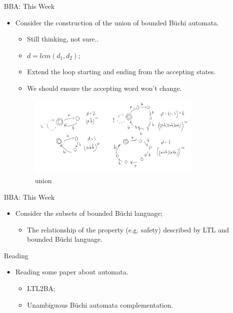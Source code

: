 \documentclass[aspectratio=1610, 13pt]{beamer}
\newcommand{\buchi}{B\"uchi }
\begin{document}
\begin{frame}{BBA: This Week}
    \begin{itemize}
        \item Consider the construction of the union of bounded \buchi automata.
        \begin{itemize}
            \item Still thinking, not sure..
            \item $d = lcm(d_1, d_2)$;
            \item Extend the loop starting and ending from the accepting states.
            \item We should ensure the accepting word won't change. 
        \end{itemize}
         \begin{figure}[b]
            \centering  
            \includegraphics[width=0.8\textwidth]{1.jpeg}
            \caption{union}
            \end{figure}
    \end{itemize}
\end{frame}

\begin{frame}{BBA: This Week}
\begin{itemize}
    \item Consider the subsets of bounded \buchi language;
    \begin{itemize}
        \item The relationship of the property (e.g. safety) described by LTL and bounded \buchi language. 
    \end{itemize}
\end{itemize}
\end{frame}

\begin{frame}{Reading}
\begin{itemize}
     \item Reading some paper about automata.
    \begin{itemize}
        \item LTL2BA;
        \item Unambiguous \buchi automata complementation.
    \end{itemize}
\end{itemize}
\end{frame}
\end{document}
